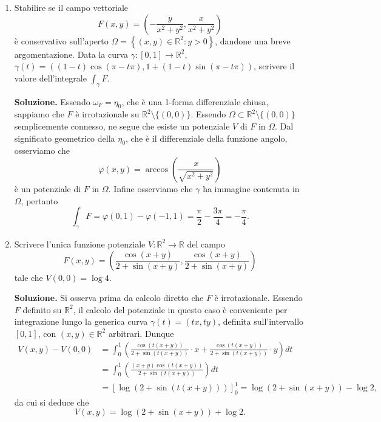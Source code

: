 \begin{enumerate}
	\textbf{Soluzione.}
		Siccome $\Omega$ è semplicemente connesso, il campo vettoriale è conservativo se e solo se è chiuso. Dobbiamo cercare i valori di $\alpha \in \mathbb{R}$ tali che $\partial_y F_1 = \partial_x F_2$ su $\Omega$. Tale uguaglianza corrisponde alla seguente
		\[
		\alpha \frac{x^2 - y^2}{(x^2 + y^2)^2} = \frac{y^2 - x^2}{(x^2 + y^2)^2}
		\]
		per ogni $(x,y) \in \Omega$, la quale può essere verificata se e solo se $\alpha = -1$. Una primitiva di $F$ su $\Omega$ per $\alpha = -1$ è
		\[
		g(x,y) = \arctan\left(\frac{y}{x}\right).
		\]
	
	
	\item Stabilire se il campo vettoriale
	\[
	F(x,y) = \left(-\frac{y}{x^2 + y^2}, \frac{x}{x^2 + y^2}\right)
	\]
	è conservativo sull'aperto $\Omega = \left\{(x,y) \in \mathbb{R}^2 : y > 0\right\}$, dandone una breve argomentazione. Data la curva $\gamma: [0,1] \to \mathbb{R}^2$, $\gamma(t) = \left((1 - t) \cos(\pi - t\pi), 1 + (1 - t) \sin(\pi - t\pi)\right)$, scrivere il valore dell'integrale $\int_{\gamma} F$.
	
	\textbf{Soluzione.}
		Essendo $\omega_F = \eta_0$, che è una 1-forma differenziale chiusa, sappiamo che $F$ è irrotazionale su $\mathbb{R}^2 \setminus \{(0,0)\}$. Essendo $\Omega \subset \mathbb{R}^2 \setminus \{(0,0)\}$ semplicemente connesso, ne segue che esiste un potenziale $V$ di $F$ in $\Omega$. Dal significato geometrico della $\eta_0$, che è il differenziale della funzione angolo, osserviamo che
		\[
		\varphi(x,y) = \arccos\left(\frac{x}{\sqrt{x^2 + y^2}}\right)
		\]
		è un potenziale di $F$ in $\Omega$. Infine osserviamo che $\gamma$ ha immagine contenuta in $\Omega$, pertanto
		\[
		\int_{\gamma} F = \varphi(0,1) - \varphi(-1,1) = \frac{\pi}{2} - \frac{3\pi}{4} = -\frac{\pi}{4}.
		\]
	
	
	\item Scrivere l'unica funzione potenziale $V: \mathbb{R}^2 \to \mathbb{R}$ del campo
	\[
	F(x,y) = \left(\frac{\cos(x + y)}{2 + \sin(x + y)}, \frac{\cos(x + y)}{2 + \sin(x + y)}\right)
	\]
	tale che $V(0,0) = \log 4$.
	
	\textbf{Soluzione.}
		Si osserva prima da calcolo diretto che $F$ è irrotazionale. Essendo $F$ definito su $\mathbb{R}^2$, il calcolo del potenziale in questo caso è conveniente per integrazione lungo la generica curva $\gamma(t) = (tx, ty)$, definita sull'intervallo $[0,1]$, con $(x,y) \in \mathbb{R}^2$ arbitrari. Dunque
		\[
		\begin{aligned}
			V(x,y) - V(0,0) &= \int_0^1 \left(\frac{\cos(t(x + y))}{2 + \sin(t(x + y))} \cdot x + \frac{\cos(t(x + y))}{2 + \sin(t(x + y))} \cdot y\right) dt \\
			&= \int_0^1 \left(\frac{(x + y) \cos(t(x + y))}{2 + \sin(t(x + y))}\right) dt \\
			&= \left[\log(2 + \sin(t(x + y)))\right]_0^1 = \log(2 + \sin(x + y)) - \log 2,
		\end{aligned}
		\]
		da cui si deduce che
		\[
		V(x,y) = \log(2 + \sin(x + y)) + \log 2.
		\]
	

\end{enumerate}
